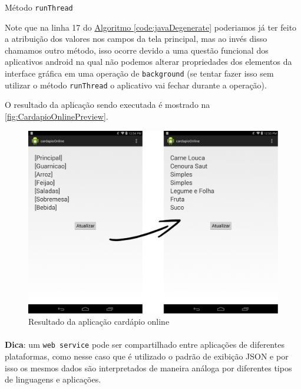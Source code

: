 \documentclass[a4paper,12pt,brazil,oneside]{book}
\begin{document}
\begin{listing}[H]
	\inputminted[linenos=true,fontsize=\small,frame=lines, framesep=2mm, tabsize=2,numbersep=5pt]{xml}{src/devapp/cardapio/runThread.java}
	\caption{Método \texttt{runThread}}
	\label{code:javaRunThread}
	\end{listing}
	
Note que na linha 17 do \hyperref[code:javaDegenerate]{Algoritmo \ref*{code:javaDegenerate}} poderiamos já ter feito a atribuição dos valores nos campos da tela principal, mas ao invés disso chamamos outro método, isso ocorre devido a uma questão funcional dos aplicativos android na qual não podemos alterar propriedades dos elementos da interface gráfica em uma operação de \texttt{background} (se tentar fazer isso sem utilizar o método \texttt{runThread} o aplicativo vai fechar durante a operação).

O resultado da aplicação sendo executada é mostrado na \autoref{fig:CardapioOnlinePreview}.

\begin{figure}[H]
  \centering
  \includegraphics[width=.75\textwidth]{figuras/devapp/cardapio/appPreview.png}
  \caption{Resultado da aplicação cardápio online}
  \label{fig:CardapioOnlinePreview}
\end{figure}

\begin{framed}
\paragraph{}\textbf{Dica}: um \texttt{web service} pode ser compartilhado entre aplicações de diferentes plataformas, como nesse caso que é utilizado o padrão de exibição JSON e por isso os mesmos dados são interpretados de maneira análoga por diferentes tipos de linguagens e aplicações.
\end{framed}

\singlespace
{}
\cleardoublepage
\thispagestyle{empty}
{}


\doublespace
\end{document}
